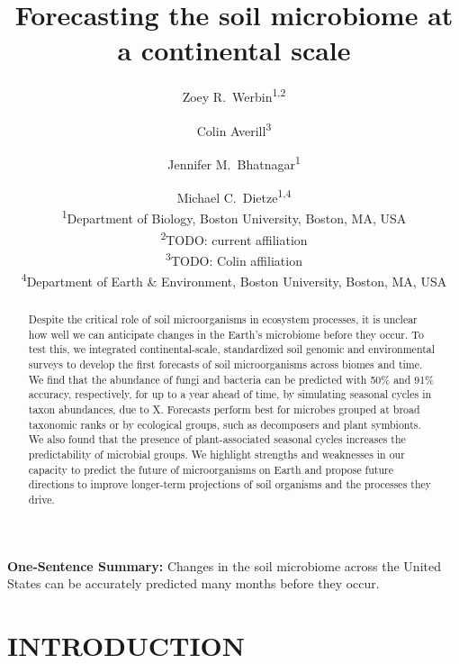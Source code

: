 \documentclass[11pt]{article}
\title{Forecasting the soil microbiome at a continental scale}
\author{
  Zoey R.\ Werbin\textsuperscript{1,2}
  \and Colin Averill\textsuperscript{3}
  \and Jennifer M.\ Bhatnagar\textsuperscript{1}
  \and Michael C.\ Dietze\textsuperscript{1,4}
  \\[1em]
  \small\textsuperscript{1}Department of Biology, Boston University, Boston, MA, USA \\
  \small\textsuperscript{2}TODO: current affiliation \\
  \small\textsuperscript{3}TODO: Colin affiliation \\
  \small\textsuperscript{4}Department of Earth \& Environment, Boston University, Boston, MA, USA
}
\date{}
\begin{document}
\maketitle


\begin{abstract}
Despite the critical role of soil microorganisms in ecosystem processes, it is unclear how well we can anticipate changes in the Earth's microbiome before they occur. To test this, we integrated continental-scale, standardized soil genomic and environmental surveys to develop the first forecasts of soil microorganisms across biomes and time. We find that the abundance of fungi and bacteria can be predicted with 50\% and 91\% accuracy, respectively, for up to a year ahead of time, by simulating seasonal cycles in taxon abundances, due to X. Forecasts perform best for microbes grouped at broad taxonomic ranks or by ecological groups, such as decomposers and plant symbionts. We also found that the presence of plant-associated seasonal cycles increases the predictability of microbial groups. We highlight strengths and weaknesses in our capacity to predict the future of microorganisms on Earth and propose future directions to improve longer-term projections of soil organisms and the processes they drive.
\end{abstract}


\noindent\textbf{One-Sentence Summary:} Changes in the soil microbiome across the United States can be accurately predicted many months before they occur.


\section{INTRODUCTION}
\end{document}
